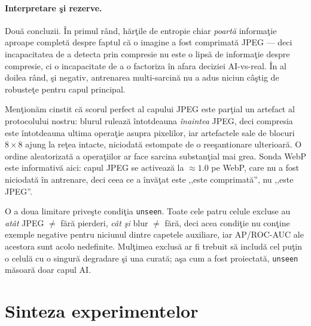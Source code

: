 \paragraph{Interpretare şi rezerve.} Două concluzii. În primul rând, hărţile de
entropie chiar \emph{poartă} informaţie aproape completă despre faptul că o
imagine a fost comprimată JPEG --- deci incapacitatea de a detecta prin compresie
nu este o lipsă de informaţie despre compresie, ci o incapacitate de a o
factoriza în afara deciziei AI-vs-real. În al doilea rând, şi negativ,
antrenarea multi-sarcină nu a adus niciun câştig de robusteţe pentru capul
principal.

Menţionăm cinstit că scorul perfect al capului JPEG este parţial un artefact al
protocolului nostru: blurul rulează întotdeauna \emph{înaintea} JPEG, deci
compresia este întotdeauna ultima operaţie asupra pixelilor, iar artefactele sale
de blocuri $8\times8$ ajung la reţea intacte, niciodată estompate de o
reeşantionare ulterioară. O ordine aleatorizată a operaţiilor ar face sarcina
substanţial mai grea. Sonda WebP este informativă aici: capul JPEG se activează
la $\approx1.0$ pe WebP, care nu a fost niciodată în antrenare, deci ceea ce a
învăţat este ,,este comprimată'', nu ,,este JPEG''.

O a doua limitare priveşte condiţia \texttt{unseen}. Toate cele patru celule
excluse au \emph{atât} JPEG $\neq$ fără pierderi, \emph{cât şi} blur $\neq$ fără,
deci acea condiţie nu conţine exemple negative pentru niciunul dintre capetele
auxiliare, iar AP/ROC-AUC ale acestora sunt acolo nedefinite. Mulţimea exclusă ar
fi trebuit să includă cel puţin o celulă cu o singură degradare şi una curată;
aşa cum a fost proiectată, \texttt{unseen} măsoară doar capul AI.

\section{Sinteza experimentelor}
\label{sec:summary}

